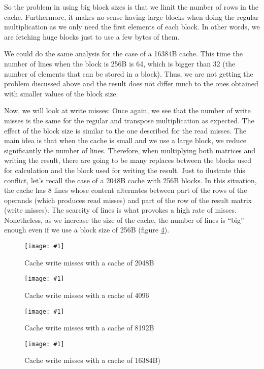 \documentclass{article}
\newcommand{\myFigure}[4]{%
    \begin{figure}[!ht]
        \texttt{[image: \#1]}
        \centering
        \caption{#2}
        \label{#3}
    \end{figure}
}
\begin{document}
So the problem in using big block sizes is that we limit the number of rows in the cache. Furthermore, it makes no sense having large blocks when doing the regular multiplication as we only need the first elements of each block. In other words, we are fetching huge blocks just to use a few bytes of them.

We could do the same analysis for the case of a 16384B cache. 
This time the number of lines when the block is 256B is 64, which is bigger than 32 (the number of elements that can be stored in a block).
Thus, we are not getting the problem discussed above and the result does not differ much to the ones obtained with smaller values of the block size.

\pagebreak

Now, we will look at write misses:
Once again, we see that the number of write misses is the same for the regular and transpose multiplication as expected. The effect of the block size is similar to the one described for the read misses. The main idea is that when the cache is small and we use a large block, we reduce significantly the number of lines. Therefore, when multiplying both matrices and writing the result, there are going to be many replaces between the blocks used for calculation and the block used for writing the result. Just to ilustrate this conflict, let's recall the case of a 2048B cache with 256B blocks. In this situation, the cache has 8 lines whose content alternates between part of the rows of the operands (which produces read misses) and part of the row of the result matrix (write misses). The scarcity of lines is what provokes a high rate of misses. Nonetheless, as we increase the size of the cache, the number of lines is ``big'' enough even if we use a block size of 256B (figure \ref{block_16384B_esc}).


\myFigure{../material_P3/protect_out4/BlockSize_2048/cache_escritura.png}{Cache write misses with a cache of 2048B}{block_2048_esc}{0.52}


\myFigure{../material_P3/protect_out4/BlockSize_4096/cache_escritura.png}{Cache write misses with a cache of 4096}{block_4096_esc}{0.52}

\myFigure{../material_P3/protect_out4/BlockSize_8192/cache_escritura.png}{Cache write misses with a cache of 8192B}{block_8192B_esc}{0.52}

\myFigure{../material_P3/protect_out4/BlockSize_16384/cache_escritura.png}{Cache write misses with a cache of 16384B)}{block_16384B_esc}{0.52}
\end{document}
